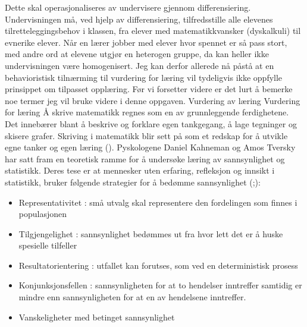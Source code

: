 \documentclass[main.tex]{subfiles}
\begin{document}
Dette skal operasjonaliseres av undervisere gjennom differensiering.  Undervisningen må, ved hjelp av differensiering, 
tilfredsstille alle elevenes tilretteleggingsbehov i klassen, fra elever med matematikkvansker (dyskalkuli) til evnerike elever. Når en lærer jobber 
med elever hvor spennet er så pass stort, med andre ord at elevene utgjør en heterogen gruppe, da kan heller ikke undervisningen 
være homogenisert. Jeg kan derfor allerede nå påstå at en behavioristisk tilnærming til vurdering for læring vil tydeligvis ikke oppfylle prinsippet om tilpasset opplæring.
\newline
\newline
Før vi forsetter videre er det lurt å bemerke noe termer jeg vil bruke videre i denne oppgaven.
\newline
Vurdering av læring
\newline
Vurdering for læring
\newline
\newline
Å skrive matematikk regnes som en av grunnleggende ferdighetene. Det innebærer blant å beskrive og forklare 
egen tankgegang, å lage tegninger og skisere grafer. Skriving i matematikk blir sett på som et redskap for å 
utvikle egne tanker og egen læring (\citeNP{udirGF]}).
\newline
\newline
Pyskologene Daniel Kahneman og Amos Tversky har satt fram en teoretisk ramme for å undersøke læring av sannsynlighet og statistikk. Deres tese er at mennesker uten erfaring, refleksjon og innsikt i statistikk,
bruker følgende strategier for å bedømme sannsynlighet (;):
\begin{itemize}
\item Representativitet : små utvalg skal representere den fordelingen som finnes i populasjonen
\item Tilgjengelighet : sannsynlighet bedømmes ut fra hvor lett det er å huske spesielle tilfeller
\item Resultatorientering : utfallet kan forutses, som ved en deterministisk prosess
\item Konjunksjonsfellen : sannsynligheten for at to hendelser inntreffer samtidig er mindre enn sannsynligheten
for at en av hendelsene inntreffer.
\item Vanskeligheter med betinget sannsynlighet
\end{itemize}
\end{document}
